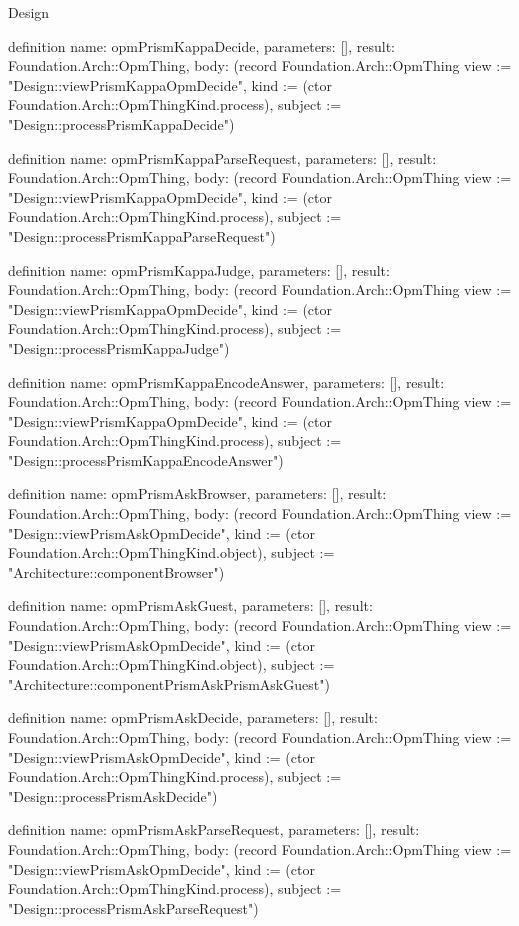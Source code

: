 \begin{lexlean}{Design}
\begin{semanticmodule}
definition{
  name: opmPrismKappaDecide,
  parameters: [],
  result: Foundation.Arch::OpmThing,
  body: (record Foundation.Arch::OpmThing {view := "Design::viewPrismKappaOpmDecide", kind := (ctor Foundation.Arch::OpmThingKind.process), subject := "Design::processPrismKappaDecide"})
}

definition{
  name: opmPrismKappaParseRequest,
  parameters: [],
  result: Foundation.Arch::OpmThing,
  body: (record Foundation.Arch::OpmThing {view := "Design::viewPrismKappaOpmDecide", kind := (ctor Foundation.Arch::OpmThingKind.process), subject := "Design::processPrismKappaParseRequest"})
}

definition{
  name: opmPrismKappaJudge,
  parameters: [],
  result: Foundation.Arch::OpmThing,
  body: (record Foundation.Arch::OpmThing {view := "Design::viewPrismKappaOpmDecide", kind := (ctor Foundation.Arch::OpmThingKind.process), subject := "Design::processPrismKappaJudge"})
}

definition{
  name: opmPrismKappaEncodeAnswer,
  parameters: [],
  result: Foundation.Arch::OpmThing,
  body: (record Foundation.Arch::OpmThing {view := "Design::viewPrismKappaOpmDecide", kind := (ctor Foundation.Arch::OpmThingKind.process), subject := "Design::processPrismKappaEncodeAnswer"})
}

definition{
  name: opmPrismAskBrowser,
  parameters: [],
  result: Foundation.Arch::OpmThing,
  body: (record Foundation.Arch::OpmThing {view := "Design::viewPrismAskOpmDecide", kind := (ctor Foundation.Arch::OpmThingKind.object), subject := "Architecture::componentBrowser"})
}

definition{
  name: opmPrismAskGuest,
  parameters: [],
  result: Foundation.Arch::OpmThing,
  body: (record Foundation.Arch::OpmThing {view := "Design::viewPrismAskOpmDecide", kind := (ctor Foundation.Arch::OpmThingKind.object), subject := "Architecture::componentPrismAskPrismAskGuest"})
}

definition{
  name: opmPrismAskDecide,
  parameters: [],
  result: Foundation.Arch::OpmThing,
  body: (record Foundation.Arch::OpmThing {view := "Design::viewPrismAskOpmDecide", kind := (ctor Foundation.Arch::OpmThingKind.process), subject := "Design::processPrismAskDecide"})
}

definition{
  name: opmPrismAskParseRequest,
  parameters: [],
  result: Foundation.Arch::OpmThing,
  body: (record Foundation.Arch::OpmThing {view := "Design::viewPrismAskOpmDecide", kind := (ctor Foundation.Arch::OpmThingKind.process), subject := "Design::processPrismAskParseRequest"})
}


\end{semanticmodule}
\end{lexlean}
